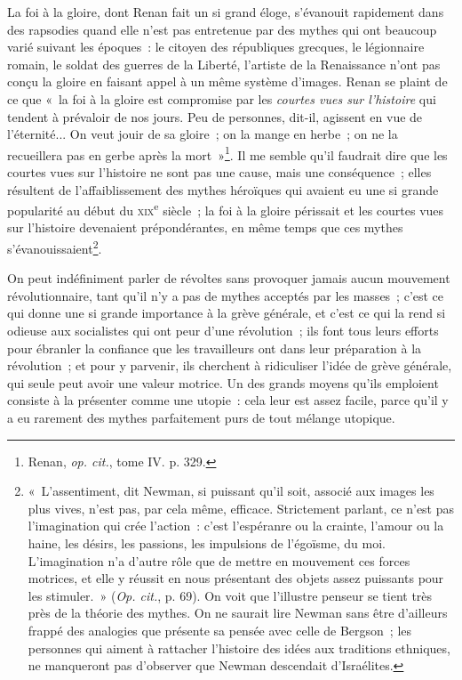 \documentclass[french,twoside]{book} %
\begin{document}
La foi à la gloire, dont Renan fait un si grand éloge, s’évanouit rapidement dans des rapsodies quand elle n’est pas entretenue par des mythes qui ont beaucoup varié suivant les époques : le citoyen des républiques  grecques, le légionnaire romain, le soldat des guerres de la Liberté, l’artiste de la Renaissance n’ont pas conçu la gloire en faisant appel à un même système d’images. Renan se plaint de ce que « la foi à la gloire est compromise par les \emph{courtes vues sur l’histoire} qui tendent à prévaloir de nos jours. Peu de personnes, dit-il, agissent en vue de l’éternité... On veut jouir de sa gloire ; on la mange en herbe ; on ne la recueillera pas en gerbe après la mort »\footnote{ \noindent Renan, \emph{op. cit.}, tome IV. p. 329.
 }. Il me semble qu’il faudrait dire que les courtes vues sur l’histoire ne sont pas une cause, mais une conséquence ; elles résultent de l’affaiblissement des mythes héroïques qui avaient eu une si grande popularité au début du {\scshape xix}\textsuperscript{e} siècle ; la foi à la gloire périssait et les courtes vues sur l’histoire devenaient prépondérantes, en même temps que ces mythes s’évanouissaient\footnote{ \noindent « L’assentiment, dit Newman, si puissant qu’il soit, associé aux images les plus vives, n’est pas, par cela même, efficace. Strictement parlant, ce n’est pas l’imagination qui crée l’action : c’est l’espéranre ou la crainte, l’amour ou la haine, les désirs, les passions, les impulsions de l’égoïsme, du moi. L’imagination n’a d’autre rôle que de mettre en mouvement ces forces motrices, et elle y réussit en nous présentant des objets assez puissants pour les stimuler. » (\emph{Op. cit.}, p. 69). On voit que l’illustre penseur se tient très près de la théorie des mythes. On ne saurait lire Newman sans être d’ailleurs frappé des analogies que présente sa pensée avec celle de Bergson ; les personnes qui aiment à rattacher l’histoire des idées aux traditions ethniques, ne manqueront pas d’observer que Newman descendait d’Israélites.
 }.\par
On peut indéfiniment parler de révoltes sans provoquer jamais aucun mouvement révolutionnaire, tant qu’il n’y  a pas de mythes acceptés par les masses ; c’est ce qui donne une si grande importance à la grève générale, et c’est ce qui la rend si odieuse aux socialistes qui ont peur d’une révolution ; ils font tous leurs efforts pour ébranler la confiance que les travailleurs ont dans leur préparation à la révolution ; et pour y parvenir, ils cherchent à ridiculiser l’idée de grève générale, qui seule peut avoir une valeur motrice. Un des grands moyens qu’ils emploient consiste à la présenter comme une utopie : cela leur est assez facile, parce qu’il y a eu rarement des mythes parfaitement purs de tout mélange utopique.\par
\end{document}
